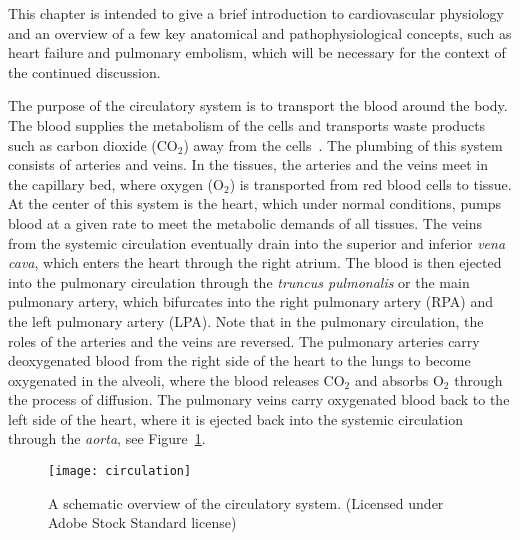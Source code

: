 This chapter is intended to give a brief introduction to cardiovascular physiology and an overview of a few key anatomical and pathophysiological concepts, such as heart failure and pulmonary embolism, which will be necessary for the context of the continued discussion.

The purpose of the circulatory system is to transport the blood around the body. The blood supplies the metabolism of the cells and transports waste products such as carbon dioxide ($\textrm{CO}_2$) away from the cells~\cite{Hall2016}. The plumbing of this system consists of arteries and veins. In the tissues, the arteries and the veins meet in the capillary bed, where oxygen ($\textrm{O}_2$) is transported from red blood cells to tissue. At the center of this system is the heart, which under normal conditions, pumps blood at a given rate to meet the metabolic demands of all tissues. The veins from the systemic circulation eventually drain into the superior and inferior \emph{vena cava}, which enters the heart through the right atrium. The blood is then ejected into the pulmonary circulation through the \emph{truncus pulmonalis} or the main pulmonary artery, which bifurcates into the right pulmonary artery (RPA)  and the left pulmonary artery (LPA).  Note that in the pulmonary circulation, the roles of the arteries and the veins are reversed. The pulmonary arteries carry deoxygenated blood from the right side of the heart to the lungs to become oxygenated in the alveoli, where the blood releases $\textrm{CO}_2$ and absorbs $\textrm{O}_2$ through the process of diffusion. The pulmonary veins carry oxygenated blood back to the left side of the heart, where it is ejected back into the systemic circulation through the \emph{aorta}, see Figure~\ref{fig:circulation}.
\begin{figure}[htbp]
\centering
\texttt{[image: circulation]}
\caption{A schematic overview of the circulatory system. (Licensed under Adobe Stock Standard license)}
\label{fig:circulation}
\end{figure}


